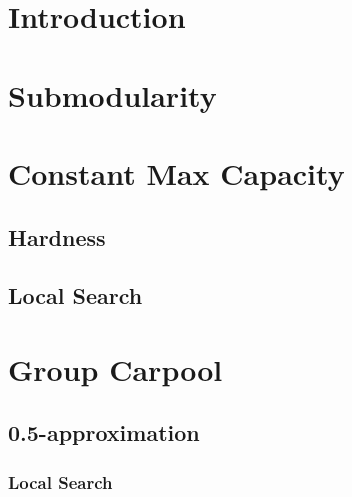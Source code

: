 \begin{abstract}

\end{abstract}

\section{Introduction}


\section{Submodularity}
\label{sec:sub}


\section{Constant Max Capacity}

	\subsection{Hardness}
	\label{sec:hardness}
	

	\subsection{Local Search}
	\label{sec:local}
	

\section{Group Carpool}
\label{sec:group}

	\subsection{0.5-approximation}
	
	\subsubsection{Local Search}
	
